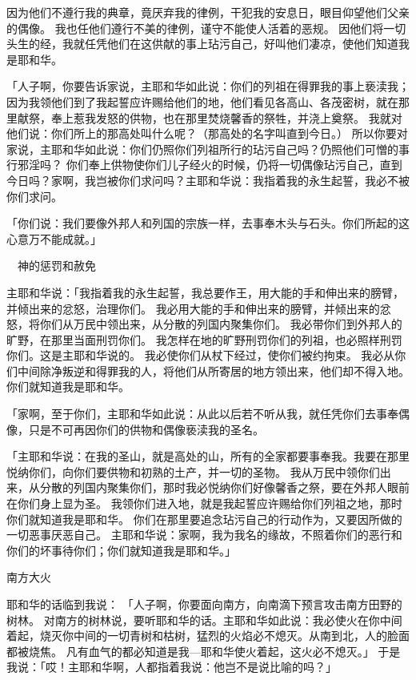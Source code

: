{因为他们不遵行我的典章，竟厌弃我的律例，干犯我的安息日，眼目仰望他们父亲的偶像。
我也任他们遵行不美的律例，谨守不能使人活着的恶规。
因他们将一切头生的经{}，我就任凭他们在这供献的事上玷污自己，好叫他们凄凉，使他们知道我是耶和华。
\par }{\PP {}「人子啊，你要告诉{}家说，主耶和华如此说：你们的列祖在得罪我的事上亵渎我；
因为我领他们到了我起誓应许赐给他们的地，他们看见各高山、各茂密树，就在那里献祭，奉上惹我发怒的供物，也在那里焚烧馨香的祭牲，并浇上奠祭。
我就对他们说：你们所上的那高处叫什么呢？（那高处的名字叫{}直到今日。）
所以你要对{}家说，主耶和华如此说：你们仍照你们列祖所行的玷污自己吗？仍照他们可憎的事行邪淫吗？
你们奉上供物使你们儿子经火的时候，仍将一切偶像玷污自己，直到今日吗？{}家啊，我岂被你们求问吗？主耶和华说：我指着我的永生起誓，我必不被你们求问。
\par }{\PP {}「你们说：我们要像外邦人和列国的宗族一样，去事奉木头与石头。你们所起的这心意万不能成就。」
\par }{\SH 　神的惩罚和赦免
\par }{\PP {}主耶和华说：「我指着我的永生起誓，我总要作王，用大能的手和伸出来的膀臂，并倾出来的忿怒，治理你们。
我必用大能的手和伸出来的膀臂，并倾出来的忿怒，将你们从万民中领出来，从分散的列国内聚集你们。
我必带你们到外邦人的旷野，在那里当面刑罚你们。
我怎样在{}地的旷野刑罚你们的列祖，也必照样刑罚你们。这是主耶和华说的。
我必使你们从杖下经过，使你们被约拘束。
我必从你们中间除净叛逆和得罪我的人，将他们从所寄居的地方领出来，他们却不得入{}地。你们就知道我是耶和华。
\par }{\PP {}「{}家啊，至于你们，主耶和华如此说：从此以后若不听从我，就任凭你们去事奉偶像，只是不可再因你们的供物和偶像亵渎我的圣名。
\par }{\PP {}「主耶和华说：在我的圣山，就是{}高处的山，所有{}的全家都要事奉我。我要在那里悦纳你们，向你们要供物和初熟的土产，并一切的圣物。
我从万民中领你们出来，从分散的列国内聚集你们，那时我必悦纳你们好像馨香之祭，要在外邦人眼前在你们身上显为圣。
我领你们进入{}地，就是我起誓应许赐给你们列祖之地，那时你们就知道我是耶和华。
你们在那里要追念玷污自己的行动作为，又要因所做的一切恶事厌恶自己。
主耶和华说：{}家啊，我为我名的缘故，不照着你们的恶行和你们的坏事待你们；你们就知道我是耶和华。」
\par }{\SH 南方大火
\par }{\PP {}耶和华的话临到我说：
「人子啊，你要面向南方，向南滴下预言攻击南方田野的树林。
对南方的树林说，要听耶和华的话。主耶和华如此说：我必使火在你中间着起，烧灭你中间的一切青树和枯树，猛烈的火焰必不熄灭。从南到北，人的脸面都被烧焦。
凡有血气的都必知道是我—耶和华使火着起，这火必不熄灭。」
于是我说：「哎！主耶和华啊，人都指着我说：他岂不是说比喻的吗？」

}
